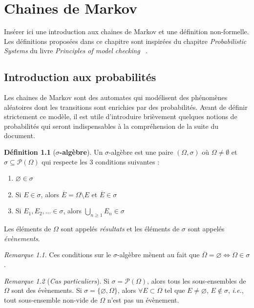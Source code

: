 \documentclass[12pt,a4paper]{report}
\theoremstyle{definition}%
\newtheorem{definition}{Définition}[chapter]
\theoremstyle{remark}
\newtheorem{remark}{Remarque}[chapter]
\newcommand{\ie}{\textit{i.e.}, }
\begin{document}
\newpage
\tableofcontents
\listoftheorems[ignoreall,show={definition,theorem}]
\newpage

\chapter{Chaines de Markov}

Insérer ici une introduction aux chaines de Markov et une définition non-formelle.\\

Les définitions proposées dans ce chapitre sont inspirées du chapitre \textit{Probabilistic Systems} du livre \textit{Principles of model checking} ~\cite{DBLP:books/daglib/0020348}.

\section{Introduction aux probabilités}
Les chaines de Markov sont des automates qui modélisent des phénomènes aléatoires dont les transitions sont enrichies par des probabilités. Avant de définir strictement ce modèle, il est utile d'introduire brièvement quelques notions de probabilités qui seront indispensables à la compréhension de la suite du document.

\begin{definition}[\textbf{$\sigma$-algèbre}]
	Un $\sigma$-algèbre est une paire $(\Omega, \sigma)$ où $\Omega \neq \emptyset $ et $\sigma \subseteq \mathcal{P}(\Omega)$ qui respecte les $3$ conditions suivantes :
	\begin{enumerate}
		\item $\varnothing \in \sigma$
		\item Si $E \in \sigma$, alors $\overline{E} = \Omega \setminus E$ et $\overline{E} \in \sigma$
		\item Si $E_1, E_2, \dots \in \sigma$, alors $\bigcup_{n \geq 1} E_n \in \sigma$
	\end{enumerate}
	Les éléments de $\Omega$ sont appelés \textit{résultats} et les éléments de $\sigma$ sont appelés \textit{évènements}.
\end{definition}

\begin{remark}
	Ces conditions sur le $\sigma$-algèbre mènent au fait que $\overline{\Omega} = \varnothing \iff \Omega \in \sigma$.
\end{remark}
\begin{remark}[\textit{Cas particuliers}]
		Si $\sigma = \mathcal{P}(\Omega)$, alors tous les sous-ensembles de $\Omega$ sont des évènements. Si
		$\sigma = \{\varnothing, \Omega\}$, alors $\forall E \subset \Omega$ tel que $E \neq \varnothing$, $E \notin \sigma$, \ie tout sous-ensemble non-vide de $\Omega$ n'est pas un évènement.
\end{remark}
\end{document}
